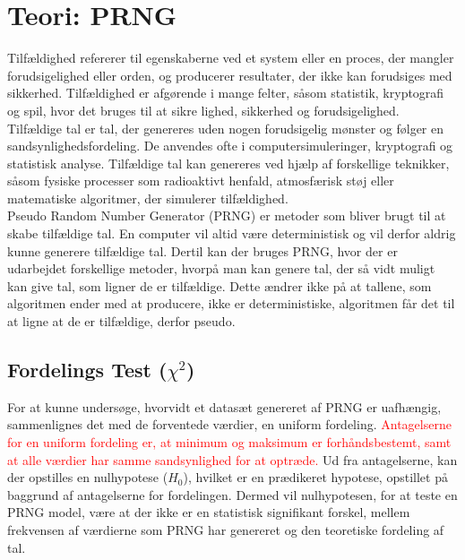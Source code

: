 \section{Teori: PRNG}
Tilfældighed refererer til egenskaberne ved et system eller en proces, der mangler forudsigelighed eller orden, og producerer resultater, der ikke kan forudsiges med sikkerhed. Tilfældighed er afgørende i mange felter, såsom statistik, kryptografi og spil, hvor det bruges til at sikre lighed, sikkerhed og forudsigelighed.
\\
Tilfældige tal er tal, der genereres uden nogen forudsigelig mønster og følger en sandsynlighedsfordeling. De anvendes ofte i computersimuleringer, kryptografi og statistisk analyse. Tilfældige tal kan genereres ved hjælp af forskellige teknikker, såsom fysiske processer som radioaktivt henfald, atmosfærisk støj eller matematiske algoritmer, der simulerer tilfældighed.
\\
Pseudo Random Number Generator (PRNG) er metoder som bliver brugt til at skabe tilfældige tal. En computer vil altid være deterministisk og vil derfor aldrig kunne generere tilfældige tal. Dertil kan der bruges PRNG, hvor der er udarbejdet forskellige metoder, hvorpå man kan genere tal, der så vidt muligt kan give tal, som ligner de er tilfældige. Dette ændrer ikke på at tallene, som algoritmen ender med at producere, ikke er deterministiske, algoritmen får det til at ligne at de er tilfældige, derfor pseudo. 

\subsection{Fordelings Test ($\chi^2$)}
For at kunne undersøge, hvorvidt et datasæt genereret af PRNG  er uafhængig, sammenlignes det med de forventede værdier, en uniform fordeling. \textcolor{red}{Antagelserne for en uniform fordeling er, at minimum og maksimum er forhåndsbestemt, samt at alle værdier har samme sandsynlighed for at optræde.} Ud fra antagelserne, kan der opstilles en nulhypotese ($H_0$), hvilket er en prædikeret hypotese, opstillet på baggrund af antagelserne for fordelingen. Dermed vil nulhypotesen, for at teste en PRNG model, være at der ikke er en statistisk signifikant forskel, mellem frekvensen af værdierne som PRNG har genereret og den teoretiske fordeling af tal. 

